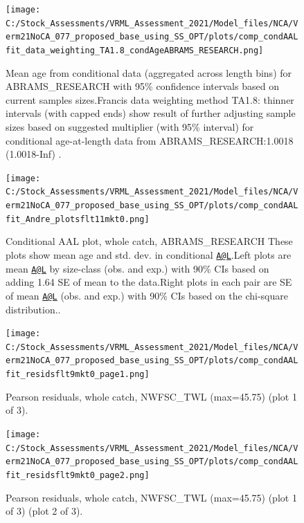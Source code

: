 \documentclass[
  english,
  a4paper,
]{article}
\begin{document}
\begin{figure}
\centering
\texttt{[image: C:/Stock\_Assessments/VRML\_Assessment\_2021/Model\_files/NCA/Verm21NoCA\_077\_proposed\_base\_using\_SS\_OPT/plots/comp\_condAALfit\_data\_weighting\_TA1.8\_condAgeABRAMS\_RESEARCH.png]}
\caption{Mean age from conditional data (aggregated across length bins) for ABRAMS\_RESEARCH with 95\% confidence intervals based on current samples sizes.Francis data weighting method TA1.8: thinner intervals (with capped ends) show result of further adjusting sample sizes based on suggested multiplier (with 95\% interval) for conditional age-at-length data from ABRAMS\_RESEARCH:1.0018 (1.0018-Inf) .\label{fig:comp_condAALfit_data_weighting_TA1.8_condAgeABRAMS_RESEARCH}}
\end{figure}

\begin{figure}
\centering
\texttt{[image: C:/Stock\_Assessments/VRML\_Assessment\_2021/Model\_files/NCA/Verm21NoCA\_077\_proposed\_base\_using\_SS\_OPT/plots/comp\_condAALfit\_Andre\_plotsflt11mkt0.png]}
\caption{Conditional AAL plot, whole catch, ABRAMS\_RESEARCH
These plots show mean age and std. dev. in conditional \href{mailto:A@L}{\nolinkurl{A@L}}.Left plots are mean \href{mailto:A@L}{\nolinkurl{A@L}} by size-class (obs. and exp.) with 90\% CIs based on adding 1.64 SE of mean to the data.Right plots in each pair are SE of mean \href{mailto:A@L}{\nolinkurl{A@L}} (obs. and exp.) with 90\% CIs based on the chi-square distribution..\label{fig:comp_condAALfit_Andre_plotsflt11mkt0}}
\end{figure}

\begin{figure}
\centering
\texttt{[image: C:/Stock\_Assessments/VRML\_Assessment\_2021/Model\_files/NCA/Verm21NoCA\_077\_proposed\_base\_using\_SS\_OPT/plots/comp\_condAALfit\_residsflt9mkt0\_page1.png]}
\caption{Pearson residuals, whole catch, NWFSC\_TWL (max=45.75) (plot 1 of 3).\label{fig:comp_condAALfit_residsflt9mkt0_page1}}
\end{figure}

\begin{figure}
\centering
\texttt{[image: C:/Stock\_Assessments/VRML\_Assessment\_2021/Model\_files/NCA/Verm21NoCA\_077\_proposed\_base\_using\_SS\_OPT/plots/comp\_condAALfit\_residsflt9mkt0\_page2.png]}
\caption{Pearson residuals, whole catch, NWFSC\_TWL (max=45.75) (plot 1 of 3) (plot 2 of 3).\label{fig:comp_condAALfit_residsflt9mkt0_page2}}
\end{figure}
\end{document}
